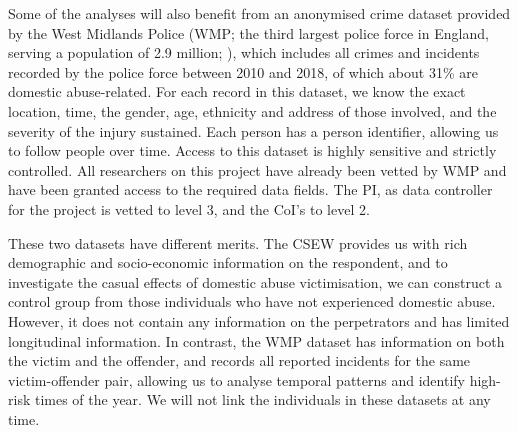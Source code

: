 \documentclass[11pt, a4paper]{article}
\begin{document}


Some of the analyses will also benefit from an anonymised crime dataset provided by the West Midlands Police (WMP; the third largest police force in England, serving a population of 2.9 million; ), which includes all crimes and incidents recorded by the police force between 2010 and 2018, of which about 31\% are domestic abuse-related. For each record in this dataset, we know the exact location, time, the gender, age, ethnicity and address of those involved, and the severity of the injury sustained. Each person has a person identifier, allowing us to follow people over time. Access to this dataset is highly sensitive and strictly controlled. All researchers on this project have already been vetted by WMP and have been granted access to the required data fields. The PI, as data controller for the project is vetted to level 3, and the CoI's to level 2.

These two datasets have different merits. The CSEW provides us with rich demographic and socio-economic information on the respondent, and to investigate the casual effects of domestic abuse victimisation, we can construct a control group from those individuals who have not experienced domestic abuse. However, it does not contain any information on the perpetrators and has limited longitudinal information. In contrast, the WMP dataset has information on both the victim and the offender, and records all reported incidents for the same victim-offender pair, allowing us to analyse temporal patterns and identify high-risk times of the year. We will not link the individuals in these datasets at any time.
\end{document}
